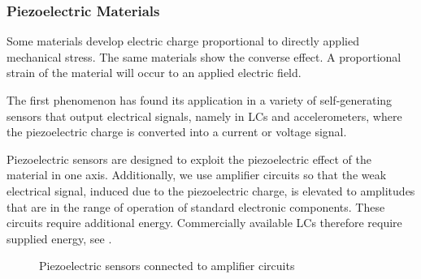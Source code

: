 \subsubsection{Piezoelectric Materials}
Some materials develop electric charge proportional to directly applied mechanical stress. The same materials show the converse effect. A proportional strain of the material will occur to an applied electric field.

The first phenomenon has found its application in a variety of self-generating sensors that output electrical signals, namely in \ac{LC}s and accelerometers, where the piezoelectric charge is converted into a current or voltage signal.

Piezoelectric sensors are designed to exploit the piezoelectric effect of the material in one axis. Additionally, we use amplifier circuits so that the weak electrical signal, induced due to the piezoelectric charge, is elevated to amplitudes that are in the range of operation of standard electronic components. These circuits require additional energy. Commercially available \ac{LC}s therefore require supplied energy, see .

\begin{figure}[!htb]
  \centering
  \hspace{4em}
  \caption[Piezoelectric Sensors in Amplifier Circuits]{Piezoelectric sensors connected to amplifier circuits~\cite{webster2018measurement}%
    \label{fig:piezo_ampcirc}}
\end{figure}

